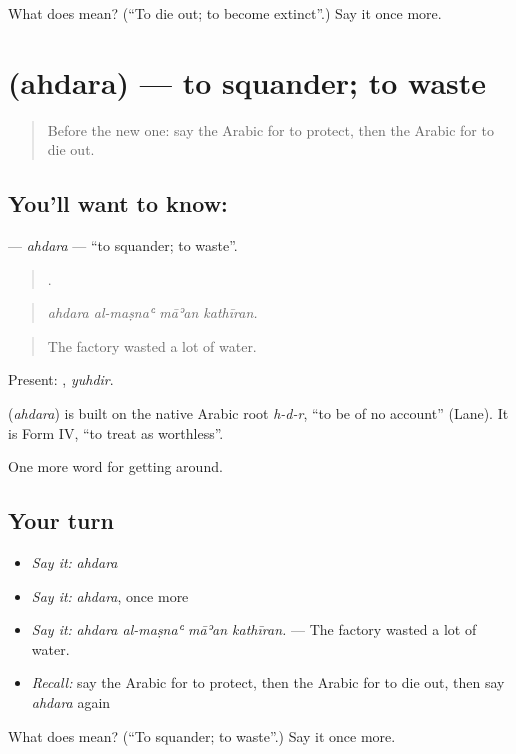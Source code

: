 \begin{tcolorbox}[breakable,colback=teal!4,colframe=teal!35!black,title={Before you move on}]
What does  mean? (\textquotedblleft{}To die out; to become extinct\textquotedblright{}.) Say it once more.
\end{tcolorbox}
\section[\texorpdfstring{\ar{أهدر} (ahdara)}{أهدر (ahdara)}]{ (ahdara) — to squander; to waste}

\label{lesson:AR-C467-ahdara-waste}



\begin{quote}
Before the new one: say the Arabic for to protect, then the Arabic for to die out.
\end{quote}

\subsection*{You'll want to know: }
\textbf{} — \emph{ahdara} — \textquotedblleft{}to squander; to waste\textquotedblright{}.

\begin{quote}
   .
\end{quote}

\begin{quote}
\emph{ahdara al-maṣnaʿ māʾan kathīran.}
\end{quote}

\begin{quote}
The factory wasted a lot of water.
\end{quote}

Present: , \emph{yuhdir}.

\begin{cousinweb}
\textbf{} (\emph{ahdara}) is built on the native Arabic root \emph{h-d-r}, \textquotedblleft{}to be of no account\textquotedblright{} (Lane). It is Form IV, \textquotedblleft{}to treat as worthless\textquotedblright{}.
\end{cousinweb}

\begin{grammarlens}[title={What you've built}]
One more word for getting around.
\end{grammarlens}

\subsection*{Your turn}
\begin{itemize}
\raggedright
  \item \emph{Say it:} \emph{ahdara}
  \item \emph{Say it:} \emph{ahdara}, once more
  \item \emph{Say it:} \emph{ahdara al-maṣnaʿ māʾan kathīran.} — The factory wasted a lot of water.
  \item \emph{Recall:} say the Arabic for to protect, then the Arabic for to die out, then say \emph{ahdara} again
\end{itemize}

\begin{tcolorbox}[breakable,colback=teal!4,colframe=teal!35!black,title={Before you move on}]
What does  mean? (\textquotedblleft{}To squander; to waste\textquotedblright{}.) Say it once more.
\end{tcolorbox}
